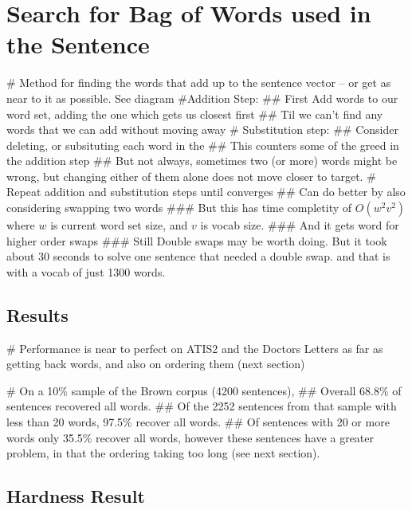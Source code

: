 \documentclass[]{scrartcl}
\begin{document}
\section{Search for Bag of Words used in the Sentence}



\begin{easylist}[itemize]
	# Method for finding the words that add up to the sentence vector -- or get as near to it as possible. See diagram
	#Addition Step:
	## First Add words to our word set, adding the one which gets us closest first
	## Til we can't find any words that we can add without moving away
	# Substitution step:
	## Consider deleting, or subsituting each word in the
	## This counters some of the greed in the addition step
	## But not always, sometimes two (or more) words might be wrong, but changing either of them alone does not move closer to target.
	# Repeat addition and substitution steps until converges
	## Can do better by also considering swapping two words
	### But this has time completity of $O(w^2 v^2)$ where $w$ is current word set size, and $v$ is vocab size.
	### And it gets word for higher order swaps
	### Still Double swaps may be worth doing. But it took about 30 seconds to solve one sentence that needed a double swap. and that is with a vocab of just 1300 words.
\end{easylist}

\subsection{Results}
\begin{easylist}[itemize]
	# Performance is near to perfect on ATIS2 and the Doctors Letters as far as getting back words, and also on ordering them (next section)
	
	# On a 10\% sample of the Brown corpus (4200 sentences),
	## Overall 68.8\% of sentences recovered all words.
	## Of the 2252 sentences from that sample with less than 20 words, 97.5\% recover all words. 
	## Of sentences with 20 or more words only 35.5\% recover all words, however these sentences have a greater problem, in that the ordering taking too long (see next section).
\end{easylist}

\subsection{Hardness Result}
\end{document}
